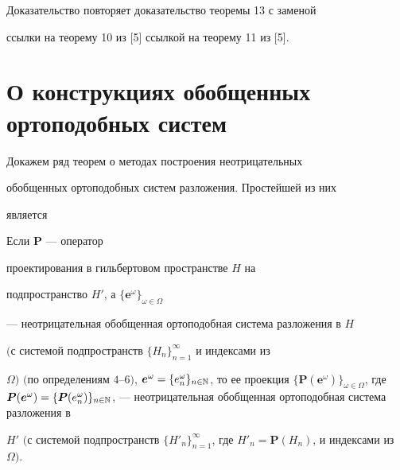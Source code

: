 Доказательство повторяет доказательство теоремы 13 с заменой


ссылки на теорему 10 из [5] ссылкой на теорему 11 из [5].





\section{О конструкциях обобщенных ортоподобных систем}





Докажем ряд теорем о методах построения неотрицательных


обобщенных ортоподобных систем разложения. Простейшей из них


является





\begin{thm}\hspace{-1.8mm}{\bf.}


Если $\boldsymbol P$ --- оператор


проектирования в гильбертовом пространстве $H$ на


подпространство $H'$, а $\{\boldsymbol e^\omega\}_{\omega\in\Omega}$


--- неотрицательная обобщенная ортоподобная система разложения в $H$


$($с системой подпространств $\{H_n\}_{n=1}^\infty$ и индексами из


$\Omega)$ $($по определениям $4$--$6)$, $\boldsymbol e^\omega=\{e^\omega_n


\}_{n\in\Bbb N}$, то ее проекция $\{\boldsymbol P(\boldsymbol


e^\omega)\}_{\omega\in\Omega}$, где $\boldsymbol P(\boldsymbol


e^\omega)=\{\boldsymbol P(e^\omega_n)\}_{n\in\Bbb


N}$, --- неотрицательная обобщенная ортоподобная система разложения в


$H'$ $($с системой подпространств $\{H'_n\}_{n=1}^\infty$, где $H'_n


=\boldsymbol P(H_n)$, и индексами из $\Omega)$.


\end{thm}





